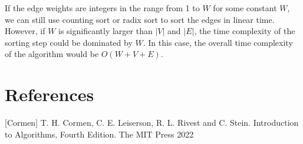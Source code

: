 \documentclass[10pt]{article}
\begin{document}
If the edge weights are integers in the range from 1 to $W$ for some constant $W$, we can still use counting sort or radix sort to sort the edges in linear time. However, if $W$ is significantly larger than $|V|$ and $|E|$, the time complexity of the sorting step could be dominated by $W$. In this case, the overall time complexity of the algorithm would be $O(W + V + E)$.

\section*{References}
[Cormen] T. H. Cormen, C. E. Leiserson, R. L. Rivest and C. Stein. Introduction to Algorithms, Fourth Edition. The MIT Press 2022
\end{document}
